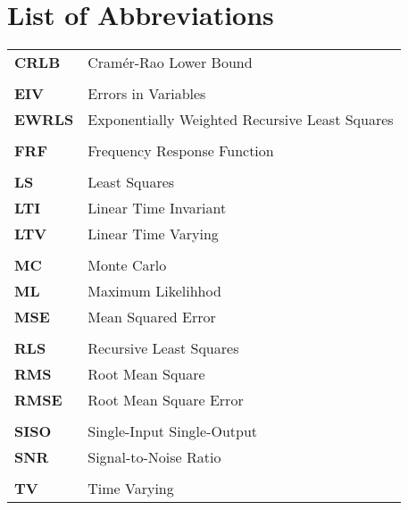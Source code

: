 \chapter*{List of Abbreviations}
\begin{longtable}[c]{>{\raggedleft}p{}>{\raggedright}p{}}
\textbf{CRLB} &   Cram\'er-Rao Lower Bound\tabularnewline
\tabularnewline
\textbf{EIV} &  Errors in Variables\tabularnewline
\textbf{EWRLS} &  Exponentially Weighted Recursive Least Squares\tabularnewline
\tabularnewline
\textbf{FRF} &   Frequency Response Function\tabularnewline
\tabularnewline
\textbf{LS} &  Least Squares\tabularnewline
\textbf{LTI} &  Linear Time Invariant\tabularnewline
\textbf{LTV} &  Linear Time Varying\tabularnewline
\tabularnewline
\textbf{MC} &  Monte Carlo\tabularnewline
\textbf{ML} &  Maximum Likelihhod\tabularnewline
\textbf{MSE} &  Mean Squared Error\tabularnewline
\tabularnewline
\textbf{RLS} &  Recursive Least Squares\tabularnewline
\textbf{RMS} &  Root Mean Square \tabularnewline
\textbf{RMSE} &  Root Mean Square Error\tabularnewline
\tabularnewline
\textbf{SISO} &  Single-Input Single-Output\tabularnewline
\textbf{SNR} &   Signal-to-Noise Ratio\tabularnewline
\tabularnewline
\textbf{TV} &   Time Varying\tabularnewline

\end{longtable}
